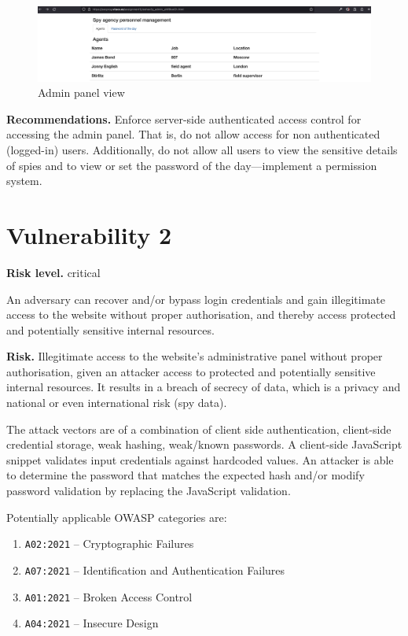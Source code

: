 \documentclass[parskip=half]{scrartcl}
\begin{document}
\begin{figure}
  \centering
  \includegraphics[width=\textwidth]{adminpanel}
  \caption{Admin panel view}
  \label{fig:adminpanel}
\end{figure}

\textbf{Recommendations.} Enforce server-side authenticated access control for
accessing the admin panel. That is, do not allow access for non authenticated
(logged-in) users. Additionally, do not allow all users to view the sensitive
details of spies and to view or set the password of the day---implement a
permission system.

\section*{Vulnerability 2}

\textbf{Risk level.} critical

An adversary can recover and/or bypass login credentials and gain illegitimate
access to the website without proper authorisation, and thereby access protected
and potentially sensitive internal resources.

\textbf{Risk.} Illegitimate access to the website's administrative panel without
proper authorisation, given an attacker access to protected and potentially
sensitive internal resources. It results in a breach of secrecy of data, which
is a privacy and national or even international risk (spy data).

The attack vectors are of a combination of client side authentication,
client-side credential storage, weak hashing, weak/known passwords. A
client-side JavaScript snippet validates input credentials against hardcoded
values. An attacker is able to determine the password that matches the expected
hash and/or modify password validation by replacing the JavaScript validation.

Potentially applicable OWASP categories are:
\begin{enumerate}
  \item \texttt{A02:2021} -- Cryptographic Failures%
  \item \texttt{A07:2021} -- Identification and Authentication Failures%
  \item \texttt{A01:2021} -- Broken Access Control%
  \item \texttt{A04:2021} -- Insecure Design%
\end{enumerate}
\end{document}

